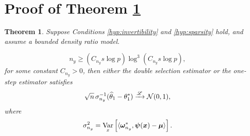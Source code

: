 \documentclass[11pt]{article}
\numberwithin{equation}{section}
\numberwithin{theorem}{section}
\def\fatx{\boldsymbol{x}}
\def\fatmu{\boldsymbol{\mu}}
\def\fatpsi{\boldsymbol{\psi}}
\def\fatomega{\boldsymbol{\omega}}
\newtheorem{thm}{Theorem}
\theoremstyle{definition}
\theoremstyle{remark}
\begin{document}
\section{Proof of Theorem \ref{thm:main}}

\begin{thm} \label{thm:main}
Suppose Conditions \ref{hyp:invertibility} and \ref{hyp:sparsity} hold, and assume a bounded density ratio model.

\begin{equation}
n_y \geq (C_{n_y} s \log p) \log^3 (C_{n_y} s \log p),
\end{equation}
for some constant $C_{n_y} > 0$, then either the double selection estimator or the one-step estimator satisfies
\begin{equation}
\sqrt{n} \, \sigma_{n_y}^{-1} (\widehat\theta_1 - \theta_1^*) \xrightarrow{\mathscr{L}} \mathcal{N}(0,1),
\end{equation}
where
\begin{equation}
\sigma_{n_y}^2 = \Var_x\left[ \langle \fatomega_{n_y}^*, \fatpsi(\fatx) - \fatmu \rangle \right].
\end{equation}
\end{thm}
\end{document}

